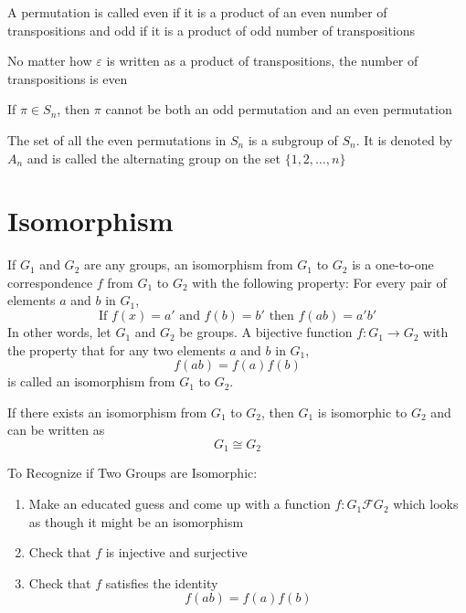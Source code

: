 \documentclass[12pt]{article}
\newcommand{\set}[1]{\{ #1 \}}
\begin{document}
\begin{definition} A permutation is called even if it is a product of an even number of transpositions and odd if it is a product of odd number of transpositions \end{definition} 

\begin{theorem} No matter how $\varepsilon$ is written as a product of transpositions, the number of transpositions is even \end{theorem} 

\begin{theorem} If $\pi \in S_n$, then $\pi$ cannot be both an odd permutation and an even permutation \end{theorem} 

\begin{definition} The set of all the even permutations in $S_n$ is a subgroup of $S_n$. It is denoted by $A_n$ and is called the alternating group on the set $\set{1, 2, \dots, n}$ \end{definition} 

\section{Isomorphism}

\begin{definition} If $G_1$ and $G_2$ are any groups, an isomorphism from $G_1$ to $G_2$ is a one-to-one correspondence $f$ from $G_1$ to $G_2$ with the following property: For every pair of elements $a$ and $b$ in $G_1$, $$\text{If } f(x) = a' \text{ and } f(b) = b' \text{ then } f(ab) = a'b' $$ 
In other words, let $G_1$ and $G_2$ be groups. A bijective function $f: G_1 \to G_2$ with the property that for any two elements $a$ and $b$ in $G_1$, $$f(ab) = f(a)f(b)$$ is called an isomorphism from $G_1$ to $G_2$. \end{definition} 

\begin{definition} If there exists an isomorphism from $G_1$ to $G_2$, then $G_1$ is isomorphic to $G_2$ and can be written as $$G_1 \cong G_2$$ \end{definition} 

To Recognize if Two Groups are Isomorphic: \begin{enumerate} 
\item Make an educated guess and come up with a function $f: G_1 \mathcal{F} G_2$ which looks as though it might be an isomorphism 
\item Check that $f$ is injective and surjective
\item Check that $f$ satisfies the identity $$f(ab) = f(a)f(b)$$ \end{enumerate} 
\end{document}
